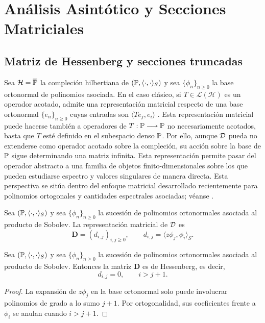 \chapter{Análisis Asintótico y Secciones Matriciales}\label{sec:matricial}

\section{Matriz de Hessenberg y secciones truncadas}

Sea $\mathcal H=\overline{\mathbb{P}}$ la compleción hilbertiana de $(\mathbb{P},\langle\cdot,\cdot\rangle_S)$ y sea $\{\phi_n\}_{n\ge0}$ la base ortonormal de polinomios asociada. En el caso clásico, si $T\in\mathcal L(\mathcal H)$ es un operador acotado, admite una representación matricial respecto de una base ortonormal $\{e_n\}_{n\ge0}$ cuyas entradas son $\langle Te_j,e_i\rangle$ \cite{Aizpuru2009Apuntes}. Esta representación matricial puede hacerse también a operadores de $T:\mathbb{P} \longrightarrow \mathbb{P}$ no necesariamente acotados, basta que $T$ esté definido en el subespacio denso $\mathbb{P}$. Por ello, aunque $\mathcal{D}$ pueda no extenderse como operador acotado sobre la compleción, su acción sobre la base de $\mathbb{P}$ sigue determinando una matriz infinita. Esta representación permite pasar del operador abstracto a una familia de objetos finito-dimensionales sobre los que pueden estudiarse espectro y valores singulares de manera directa. Esta perspectiva se sitúa dentro del enfoque matricial desarrollado recientemente para polinomios ortogonales y cantidades espectrales asociadas; véanse \cite{EGT23,EG25-2}.

\begin{defn}\label{def:hessenberg}
	Sea $(\mathbb{P}, \langle \cdot,\cdot\rangle_S)$ y sea $\{\phi_n\}_{n\ge0}$ la sucesión de polinomios ortonormales asociada al producto de Sobolev. La representación matricial de $\mathcal{D}$ es
	\[
		\mathbf D=(d_{i,j})_{i,j\ge0},
		\qquad
		d_{i,j}=\langle z\phi_j,\phi_i\rangle_S.
	\]
\end{defn}

\begin{prop}\label{prop:hessenberg}
	Sea $(\mathbb{P}, \langle \cdot,\cdot\rangle_S)$ y sea $\{\phi_n\}_{n\ge0}$ la sucesión de polinomios ortonormales asociada al producto de Sobolev.
	Entonces la matriz $\mathbf D$ es de Hessenberg, es decir,
	\[
		d_{i,j}=0,
		\qquad i>j+1.
	\]
\end{prop}

\begin{proof}
	La expansión de $z\phi_j$ en la base ortonormal solo puede involucrar polinomios de grado a lo sumo $j+1$. Por ortogonalidad, sus coeficientes frente a $\phi_i$ se anulan cuando $i>j+1$.
\end{proof}

